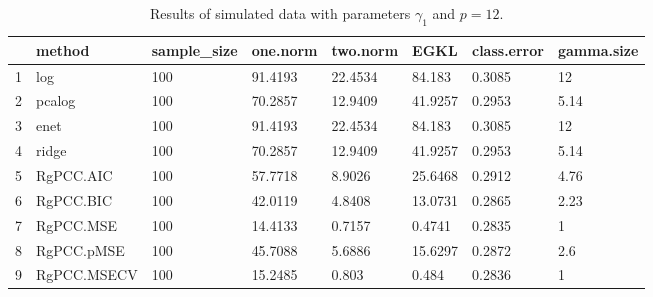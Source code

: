 \begin{table}[ht]
\centering
\begin{tabular}{rlllllll}
  \hline
 & method & sample\_size & one.norm & two.norm & EGKL & class.error & gamma.size \\ 
  \hline
1 & log & 100 & 91.4193 & 22.4534 & 84.183 & 0.3085 & 12 \\ 
  2 & pcalog & 100 & 70.2857 & 12.9409 & 41.9257 & 0.2953 & 5.14 \\ 
  3 & enet & 100 & 91.4193 & 22.4534 & 84.183 & 0.3085 & 12 \\ 
  4 & ridge & 100 & 70.2857 & 12.9409 & 41.9257 & 0.2953 & 5.14 \\ 
  5 & RgPCC.AIC & 100 & 57.7718 & 8.9026 & 25.6468 & 0.2912 & 4.76 \\ 
  6 & RgPCC.BIC & 100 & 42.0119 & 4.8408 & 13.0731 & 0.2865 & 2.23 \\ 
  7 & RgPCC.MSE & 100 & 14.4133 & 0.7157 & 0.4741 & 0.2835 & 1 \\ 
  8 & RgPCC.pMSE & 100 & 45.7088 & 5.6886 & 15.6297 & 0.2872 & 2.6 \\ 
  9 & RgPCC.MSECV & 100 & 15.2485 & 0.803 & 0.484 & 0.2836 & 1 \\ 
   \hline
\end{tabular}
\caption{Results of simulated data with parameters $\gamma_1$ and $p =12$. } 
\label{fig-1-100-lead-new-algo-12-metrics-p}
\end{table}
